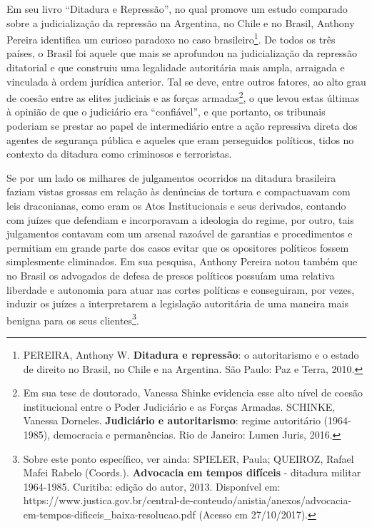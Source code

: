 Em seu livro ``Ditadura e Repressão'', no qual promove um estudo
comparado sobre a judicialização da repressão na Argentina, no Chile e
no Brasil, Anthony Pereira identifica um curioso paradoxo no caso
brasileiro\footnote{PEREIRA, Anthony W. \textbf{Ditadura e repressão}: o
  autoritarismo e o estado de direito no Brasil, no Chile e na
  Argentina. São Paulo: Paz e Terra, 2010.}. De todos os três países, o
Brasil foi aquele que mais se aprofundou na judicialização da repressão
ditatorial e que construiu uma legalidade autoritária mais ampla,
arraigada e vinculada à ordem jurídica anterior. Tal se deve, entre
outros fatores, ao alto grau de coesão entre as elites judiciais e as
forças armadas\footnote{Em sua tese de doutorado, Vanessa Shinke
  evidencia esse alto nível de coesão institucional entre o Poder
  Judiciário e as Forças Armadas. SCHINKE, Vanessa Dorneles.
  \textbf{Judiciário e autoritarismo}: regime autoritário (1964-1985),
  democracia e permanências. Rio de Janeiro: Lumen Juris, 2016.}, o que
levou estas últimas à opinião de que o judiciário era ``confiável'', e
que portanto, os tribunais poderiam se prestar ao papel de intermediário
entre a ação repressiva direta dos agentes de segurança pública e
aqueles que eram perseguidos políticos, tidos no contexto da ditadura
como criminosos e terroristas.

Se por um lado os milhares de julgamentos ocorridos na ditadura
brasileira faziam vistas grossas em relação às denúncias de tortura e
compactuavam com leis draconianas, como eram os Atos Institucionais e
seus derivados, contando com juízes que defendiam e incorporavam a
ideologia do regime, por outro, tais julgamentos contavam com um arsenal
razoável de garantias e procedimentos e permitiam em grande parte dos
casos evitar que os opositores políticos fossem simplesmente eliminados.
Em sua pesquisa, Anthony Pereira notou também que no Brasil os advogados
de defesa de presos políticos possuíam uma relativa liberdade e
autonomia para atuar nas cortes políticas e conseguiram, por vezes,
induzir os juízes a interpretarem a legislação autoritária de uma
maneira mais benigna para os seus clientes\footnote{Sobre este ponto
  específico, ver ainda: SPIELER, Paula; QUEIROZ, Rafael Mafei Rabelo
  (Coords.). \textbf{Advocacia em tempos difíceis} - ditadura militar
  1964-1985. Curitiba: edição do autor, 2013. Disponível em:
  https://www.justica.gov.br/central-de-conteudo/anistia/anexos/advocacia-em-tempos-dificeis\_baixa-resolucao.pdf
  (Acesso em 27/10/2017).}.

